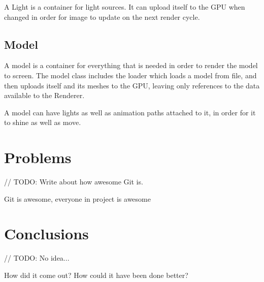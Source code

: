 \documentclass{article}
\begin{document}
A Light is a container for light sources. It can upload itself to the GPU when changed in order for image to update on the next render cycle.

\subsection{Model}

A model is a container for everything that is needed in order to render the model to screen. The model class includes the loader which loads a model from file, and then uploads itself and its meshes to the GPU, leaving only references to the data available to the Renderer.

A model can have lights as well as animation paths attached to it, in order for it to shine as well as move.

\section{Problems}

// TODO: Write about how awesome Git is.

Git is awesome, everyone in project is awesome

\section{Conclusions}

// TODO: No idea...

How did it come out? How could it have been done better?
\end{document}
